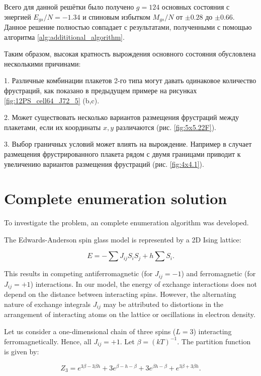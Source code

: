 \documentclass[utf8, babel, sor, jor, amsmath, amssymb, reprint]{elsarticle} %
\begin{document}
Всего для данной решётки было получено $g=124$ основных состояния с энергией $E_{gs}/N=-1.34$ и спиновым избытком $M_{gs}/N$ от $\pm 0.28$ до $\pm 0.66$. Данное решение полностью совпадает с результатами, полученными с помощью алгоритма \ref{alg:addititional_algorithm}.

Таким образом, высокая кратность вырождения основного состояния обусловлена несколькими причинами:

1. Различные комбинации плакетов 2-го типа могут давать одинаковое количество фрустраций, как показано в предыдущем примере на рисунках \ref{fig:12PS_cell64_J72_5} (b,c).

2. Может существовать несколько вариантов размещения фрустраций между плакетами, если их координаты $x,y$ различаются (рис. \ref{fig:5x5.22F}).

3. Выбор граничных условий может влиять на вырождение. Например в случает размещения фрустрированного плакета рядом с двумя границами приводит к увеличению вариантов размещения фрустраций (рис. \ref{fig:4x4.1}).



\section{Complete enumeration solution}

To investigate the problem, an complete enumeration algorithm was developed.

The Edwards-Anderson spin glass model is represented by a 2D Ising lattice:

\begin{equation}
	E = -\sum J_{ij} S_i S_j + h \sum S_i.
	\label{eq:ising_energy}
\end{equation}

This results in competing antiferromagnetic (for $J_{ij} = -1$) and ferromagnetic (for $J_{ij} = +1$) interactions. In our model, the energy of exchange interactions does not depend on the distance between interacting spins. However, the alternating nature of exchange integrals $J_{ij}$ may be attributed to distortions in the arrangement of interacting atoms on the lattice or oscillations in electron density.

Let us consider a one-dimensional chain of three spins ($L = 3$) interacting ferromagnetically. Hence, all $J_{ij} = +1$. Let $\beta = (kT)^{-1}$. The partition function is given by:

\begin{equation}
	Z_3 = e^{3\beta - 3\beta h} + 3e^{\beta - h - \beta} + 3e^{\beta h - \beta} + e^{3\beta + 3\beta h}.
	\label{eq:stat_3}
\end{equation}
\end{document}
